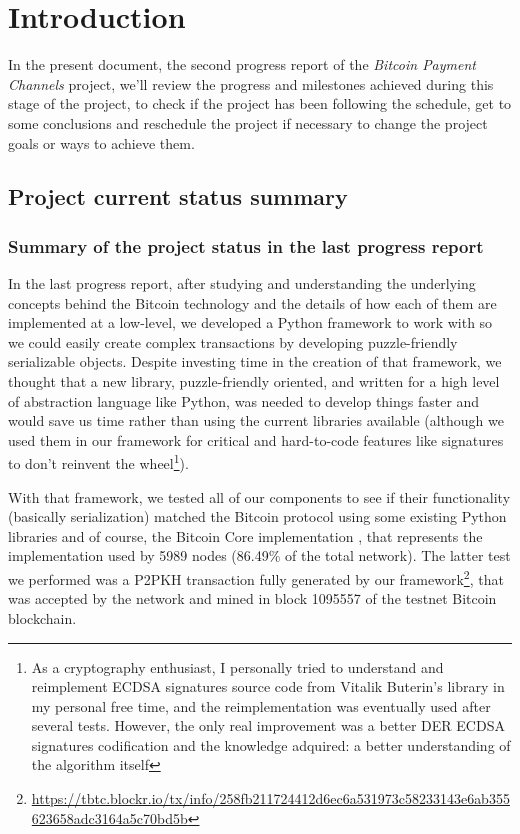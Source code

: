 \chapter*{Introduction}
\label{chap:introduction}

In the present document, the second progress report of the \textit{Bitcoin Payment Channels} project, we'll review the progress and milestones achieved during this stage of the project, to check if the project has been following the schedule, get to some conclusions and reschedule the project if necessary to change the project goals or ways to achieve them.

\section{Project current status summary}
\subsection{Summary of the project status in the last progress report}
In the last progress report, after studying and understanding the underlying concepts behind the Bitcoin technology and the details of how each of them are implemented at a low-level, we developed a Python framework to work with so we could easily create complex transactions by developing puzzle-friendly serializable objects. Despite investing time in the creation of that framework, we thought that a new library, puzzle-friendly oriented, and written for a high level of abstraction language like Python, was needed to develop things faster and would save us time rather than using the current libraries available (although we used them in our framework for critical and hard-to-code features like signatures to don't reinvent the wheel\footnote{As a cryptography enthusiast, I personally tried to understand and reimplement ECDSA signatures source code from Vitalik Buterin's library \cite{pybitcointools:online} in my personal free time, and the reimplementation was eventually used after several tests. However, the only real improvement was a better DER ECDSA signatures codification and the knowledge adquired: a better understanding of the algorithm itself}).

With that framework, we tested all of our components to see if their functionality (basically serialization) matched the Bitcoin protocol using some existing Python libraries \cite{python-bitcoinlib:online, pybitcointools:online} and of course, the Bitcoin Core implementation \cite{bitcoin-core:online}, that represents the implementation used by 5989 nodes (86.49\% of the total network). The latter test we performed was a P2PKH transaction fully generated by our framework\footnote{\url{https://tbtc.blockr.io/tx/info/258fb211724412d6ec6a531973c58233143e6ab355623658adc3164a5c70bd5b}}, that was accepted by the network and mined in block 1095557 of the testnet Bitcoin blockchain. 

